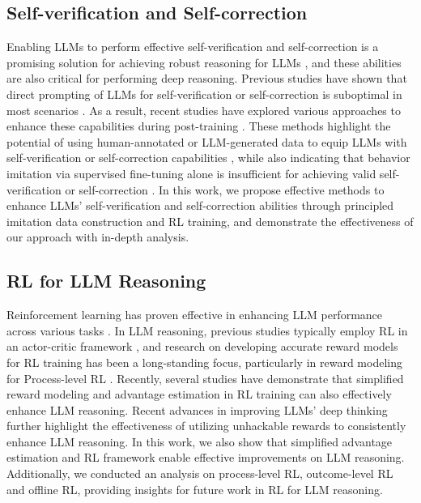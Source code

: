 \subsection{Self-verification and Self-correction}
Enabling LLMs to perform effective self-verification and self-correction is a promising solution for achieving robust reasoning for LLMs \cite{madaan2024self,shinn2023reflexion,paul2023refiner,lightman2023let}, and these abilities are also critical for performing deep reasoning.
Previous studies have shown that direct prompting of LLMs for self-verification or self-correction is suboptimal in most scenarios \cite{huang2023large,tyen2023llms,ma2024large,zhang2024understanding}. As a result, recent studies have explored various approaches to enhance these capabilities during post-training \cite{saunders2022self,rosset2024direct,kumar2024training}. These methods highlight the potential of using human-annotated or LLM-generated data to equip LLMs with self-verification or self-correction capabilities \cite{zhang2024small,jiang2024towards}, while also indicating that behavior imitation via supervised fine-tuning alone is insufficient for achieving valid self-verification or self-correction  \cite{kumar2024training,qu2025recursive,kamoi2024can}. In this work, we propose effective methods to enhance LLMs' self-verification and self-correction abilities through principled imitation data construction and RL training, and demonstrate the effectiveness of our approach with in-depth analysis.





\subsection{RL for LLM Reasoning}
Reinforcement learning has proven effective in enhancing LLM performance across various tasks \cite{ziegler2019fine,stiennon2020learning,bai2022training,ouyang2022training,setlur2025rl}. In LLM reasoning, previous studies typically employ RL in an actor-critic framework \cite{lightman2024lets,tajwar2024preference,havrilla2024teaching}, and research on developing accurate reward models for RL training has been a long-standing focus, particularly in reward modeling for Process-level RL \cite{lightman2024lets,setlur2024rewarding,setlur2025rl,luo2024improve}. Recently, several studies have demonstrate that simplified reward modeling and advantage estimation \cite{ahmadian2024back,deepseekmath,team2025kimi,guo2025deepseek} in RL training can also effectively enhance LLM reasoning. Recent advances in improving LLMs' deep thinking \cite{guo2025deepseek,team2025kimi} further highlight the effectiveness of utilizing unhackable rewards \cite{gao2023scaling,everitt2021reward} to consistently enhance LLM reasoning.
In this work, we also show that simplified advantage estimation and RL framework enable effective improvements on LLM reasoning. Additionally, we conducted an analysis on process-level RL, outcome-level RL and offline RL, providing insights for future work in RL for LLM reasoning.